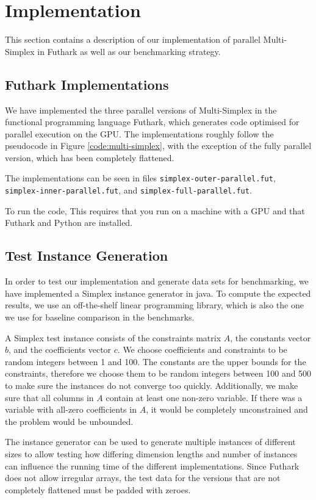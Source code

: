 \section{Implementation}

This section contains a description of our implementation of parallel Multi-Simplex in Futhark as well as our benchmarking strategy.

\subsection{Futhark Implementations}
We have implemented the three parallel versions of Multi-Simplex in the functional programming language Futhark, which generates code optimised for parallel execution on the GPU. The implementations roughly follow the pseudocode in Figure \ref{code:multi-simplex}, with the exception of the fully parallel version, which has been completely flattened.

The implementations can be seen in files \texttt{simplex-outer-parallel.fut}, \texttt{simplex-inner-parallel.fut}, and \texttt{simplex-full-parallel.fut}.

To run the code,  This requires that you run on a machine with a GPU and that Futhark and Python are installed.

\subsection{Test Instance Generation}
In order to test our implementation and generate data sets for benchmarking, we have implemented a Simplex instance generator in java. To compute the expected results, we use an off-the-shelf linear programming library, which is also the one we use for baseline comparison in the benchmarks.

\newpar A Simplex test instance consists of the constraints matrix $A$, the constants vector $b$, and the coefficients vector $c$.
We choose coefficients and constraints to be random integers between 1 and 100. The constants are the upper bounds for the constraints, therefore we choose them to be random integers between 100 and 500 to make sure the instances do not converge too quickly. Additionally, we make sure that all columns in $A$ contain at least one non-zero variable. If there was a variable with all-zero coefficients in $A$, it would be completely unconstrained and the problem would be unbounded.

\newpar The instance generator can be used to generate multiple instances of different sizes to allow testing how differing dimension lengths and number of instances can influence the running time of the different implementations. Since Futhark does not allow irregular arrays, the test data for the versions that are not completely flattened must be padded with zeroes.

